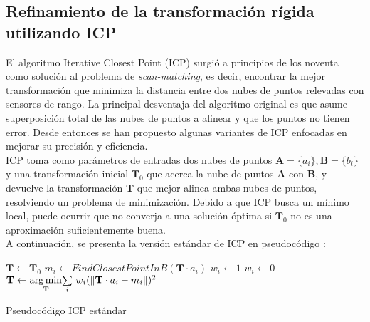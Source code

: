 \subsection{Refinamiento de la transformación rígida utilizando ICP}

El algoritmo Iterative Closest Point (ICP) \cite{Besl92} surgió a principios de los noventa como solución al problema de \textit{scan-matching}, es decir, encontrar la mejor transformación que minimiza la distancia entre dos nubes de puntos relevadas con sensores de rango. La principal desventaja del algoritmo original es que asume superposición total de las nubes de puntos a alinear y que los puntos no tienen error. Desde entonces se han propuesto algunas variantes de ICP enfocadas en mejorar su precisión y eficiencia.\\
ICP toma como parámetros de entradas dos nubes de puntos $\textbf{A} = \{a_{i}\}, \textbf{B} = \{b_{i}\}$ y una transformación inicial $\textbf{T}_{0}$ que acerca la nube de puntos \textbf{A} con \textbf{B}, y devuelve la transformación \textbf{T} que mejor alinea ambas nubes de puntos, resolviendo un problema de minimización. Debido a que ICP busca un mínimo local, puede ocurrir que no converja a una solución óptima si $\textbf{T}_{0}$ no es una aproximación suficientemente buena. \\

A continuación, se presenta la versión estándar de ICP en pseudocódigo :
\begin{algorithm}
\begin{algorithmic}

\STATE $\textbf{T} \leftarrow \textbf{T}_{0}$
\STATE $m_{i} \leftarrow FindClosestPointInB(\textbf{T} \cdot a_{i})$
\STATE $w_{i} \leftarrow 1$
\ELSE
\STATE $w_{i} \leftarrow 0$
\ENDIF
\ENDFOR
\STATE $ \textbf{T} \leftarrow \underset{\textbf{T}}{\arg\min}  \underset{i}{\sum}\ w_{i} (\lVert\textbf{T} \cdot a_{i} - m_{i} \rVert)^{2} $
\ENDWHILE

\end{algorithmic}
\caption{Pseudocódigo ICP estándar}
\label{icp-pseudocodigo}
\end{algorithm}

